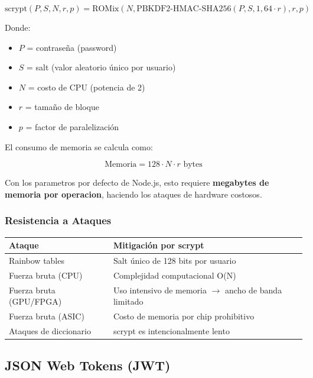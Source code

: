 \documentclass[12pt,a4paper,openany]{article}
\begin{document}
\begin{equation}
\text{scrypt}(P, S, N, r, p) = \text{ROMix}(N, \text{PBKDF2-HMAC-SHA256}(P, S, 1, 64 \cdot r), r, p)
\end{equation}

Donde:
\begin{itemize}
    \item $P$ = contraseña (password)
    \item $S$ = salt (valor aleatorio único por usuario)
    \item $N$ = costo de CPU (potencia de 2)
    \item $r$ = tamaño de bloque
    \item $p$ = factor de paralelización
\end{itemize}

El consumo de memoria se calcula como:

\begin{equation}
\text{Memoria} = 128 \cdot N \cdot r \text{ bytes}
\end{equation}

Con los parametros por defecto de Node.js, esto requiere \textbf{megabytes de memoria por operacion}, haciendo los ataques de hardware costosos.

\subsubsection{Resistencia a Ataques}

\begin{table}[H]
\centering
\begin{tabular}{@{}ll@{}}
\toprule
\textbf{Ataque} & \textbf{Mitigación por scrypt} \\
\midrule
Rainbow tables & Salt único de 128 bits por usuario \\
Fuerza bruta (CPU) & Complejidad computacional O(N) \\
Fuerza bruta (GPU/FPGA) & Uso intensivo de memoria $\rightarrow$ ancho de banda limitado \\
Fuerza bruta (ASIC) & Costo de memoria por chip prohibitivo \\
Ataques de diccionario & scrypt es intencionalmente lento \\
\bottomrule
\end{tabular}
\end{table}

\subsection{JSON Web Tokens (JWT)}
\end{document}
